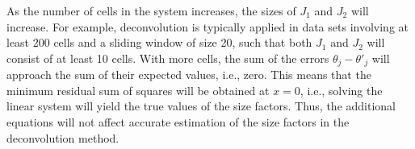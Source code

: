 \documentclass{article}
\begin{document}
As the number of cells in the system increases, the sizes of $J_1$ and $J_2$ will increase. 
For example, deconvolution is typically applied in data sets involving at least 200 cells and a sliding window of size 20, such that both $J_1$ and $J_2$ will consist of at least 10 cells.
With more cells, the sum of the errors $\theta_j - \theta'_j$ will approach the sum of their expected values, i.e., zero.
This means that the minimum residual sum of squares will be obtained at $x=0$, i.e., solving the linear system will yield the true values of the size factors.
Thus, the additional equations will not affect accurate estimation of the size factors in the deconvolution method.
\end{document}
